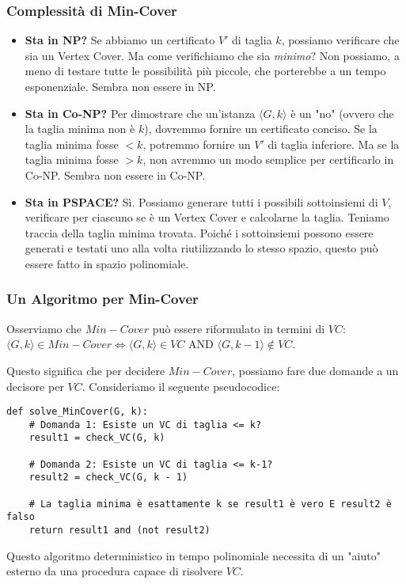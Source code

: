 \documentclass[a4paper]{article}
\theoremstyle{definition} %
\begin{document}
\subsubsection{Complessità di Min-Cover}
\begin{itemize}
    \item \textbf{Sta in NP?} Se abbiamo un certificato $V'$ di taglia $k$, possiamo verificare che sia un Vertex Cover. Ma come verifichiamo che sia \emph{minimo}? Non possiamo, a meno di testare tutte le possibilità più piccole, che porterebbe a un tempo esponenziale. Sembra non essere in NP.
    \item \textbf{Sta in Co-NP?} Per dimostrare che un'istanza $\langle G,k \rangle$ è un "no" (ovvero che la taglia minima non è $k$), dovremmo fornire un certificato conciso. Se la taglia minima fosse $< k$, potremmo fornire un $V'$ di taglia inferiore. Ma se la taglia minima fosse $> k$, non avremmo un modo semplice per certificarlo in Co-NP. Sembra non essere in Co-NP.
    \item \textbf{Sta in PSPACE?} Sì. Possiamo generare tutti i possibili sottoinsiemi di $V$, verificare per ciascuno se è un Vertex Cover e calcolarne la taglia. Teniamo traccia della taglia minima trovata. Poiché i sottoinsiemi possono essere generati e testati uno alla volta riutilizzando lo stesso spazio, questo può essere fatto in spazio polinomiale.
\end{itemize}

\subsubsection{Un Algoritmo per Min-Cover}
Osserviamo che $Min-Cover$ può essere riformulato in termini di $VC$:
$\langle G, k \rangle \in Min-Cover \iff \langle G, k \rangle \in VC \text{ AND } \langle G, k-1 \rangle \notin VC$.

Questo significa che per decidere $Min-Cover$, possiamo fare due domande a un decisore per $VC$.
Consideriamo il seguente pseudocodice:
\begin{verbatim}
def solve_MinCover(G, k):
    # Domanda 1: Esiste un VC di taglia <= k?
    result1 = check_VC(G, k)

    # Domanda 2: Esiste un VC di taglia <= k-1?
    result2 = check_VC(G, k - 1)

    # La taglia minima è esattamente k se result1 è vero E result2 è falso
    return result1 and (not result2)
\end{verbatim}
Questo algoritmo deterministico in tempo polinomiale necessita di un "aiuto" esterno da una procedura capace di risolvere $VC$.
\end{document}
